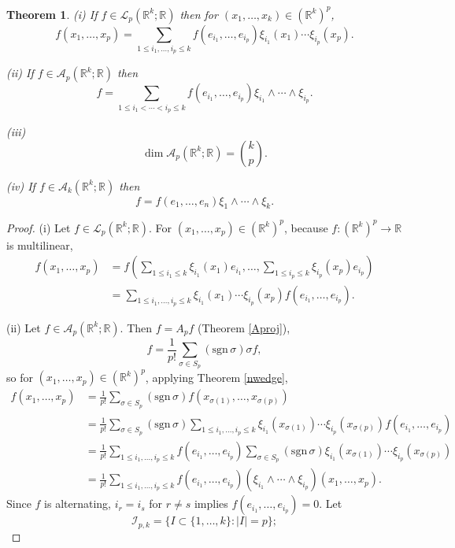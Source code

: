 \documentclass{amsart}
\newcommand{\sgn}{\mathrm{sgn}\,}
\newtheorem{theorem}{Theorem}
\theoremstyle{definition}
\begin{document}
\begin{theorem}
(i) If $f \in \mathscr{L}_p(\mathbb{R}^k;\mathbb{R})$ then for $(x_1,\ldots,x_k) \in (\mathbb{R}^k)^p$,
\[
f(x_1,\ldots,x_p) =\sum_{1 \leq i_1, \ldots, i_p \leq k} f(e_{i_1}, \ldots,e_{i_p}) \xi_{i_1}(x_1)\cdots \xi_{i_p}(x_p).
\]

(ii) If $f \in \mathscr{A}_p(\mathbb{R}^k;\mathbb{R})$ then
\[
f = \sum_{1 \leq i_1 < \cdots < i_p \leq k} f(e_{i_1}, \ldots,e_{i_p}) \xi_{i_1} \wedge \cdots \wedge \xi_{i_p}.
\]

(iii)
\[
\dim \mathscr{A}_p(\mathbb{R}^k;\mathbb{R}) = \binom{k}{p}.
\]

(iv) If $f \in \mathscr{A}_k(\mathbb{R}^k;\mathbb{R})$ then
\[
f = f(e_1,\ldots,e_n) \xi_1 \wedge \cdots \wedge \xi_k.
\]
\label{increasing}
\end{theorem}
\begin{proof}
(i) Let $f \in \mathscr{L}_p(\mathbb{R}^k;\mathbb{R})$. For $(x_1,\ldots,x_p) \in (\mathbb{R}^k)^p$, because $f:(\mathbb{R}^k)^p \to \mathbb{R}$ is multilinear,
\begin{align*}
f(x_1,\ldots,x_p)&=f\left( \sum_{1 \leq i_1 \leq k} \xi_{i_1}(x_1)e_{i_1},
\ldots,\sum_{1 \leq i_p \leq k} \xi_{i_p}(x_p)e_{i_p}\right)\\
&=\sum_{1 \leq i_1, \ldots, i_p \leq k} \xi_{i_1}(x_1)\cdots \xi_{i_p}(x_p) f(e_{i_1},
\ldots,e_{i_p}).
\end{align*}

(ii) Let $f \in \mathscr{A}_p(\mathbb{R}^k;\mathbb{R})$. Then $f=A_pf$ (Theorem \ref{Aproj}),
\[
f = \frac{1}{p!} \sum_{\sigma \in S_p} (\sgn \sigma) \sigma f,
\]
so for $(x_1,\ldots,x_p) \in (\mathbb{R}^k)^p$, applying Theorem \ref{nwedge},
\begin{align*}
f(x_1,\ldots,x_p) &= \frac{1}{p!} \sum_{\sigma \in S_p} (\sgn \sigma) f(x_{\sigma(1)},\ldots,x_{\sigma(p)})\\
&= \frac{1}{p!} \sum_{\sigma \in S_p} (\sgn \sigma) 
\sum_{1 \leq i_1, \ldots, i_p \leq k} \xi_{i_1}(x_{\sigma(1)})\cdots \xi_{i_p}(x_{\sigma(p)}) f(e_{i_1},\ldots,e_{i_p})\\
&=\frac{1}{p!} \sum_{1 \leq i_1, \ldots, i_p \leq k} f(e_{i_1},\ldots,e_{i_p}) \sum_{\sigma \in S_p} (\sgn \sigma) \xi_{i_1}(x_{\sigma(1)})\cdots \xi_{i_p}(x_{\sigma(p)})\\
&=\frac{1}{p!} \sum_{1 \leq i_1, \ldots, i_p \leq k} f(e_{i_1},\ldots,e_{i_p}) (\xi_{i_1} \wedge \cdots \wedge \xi_{i_p})(x_1,\ldots,x_p).
\end{align*}
Since $f$ is alternating, $i_r = i_s$ for $r \neq s$ implies $f(e_{i_1},\ldots,e_{i_p})=0$. 
Let 
\[
\mathscr{I}_{p,k} = \{I \subset \{1,\ldots,k\}: |I|=p\};
\]


\end{proof}
\end{document}
